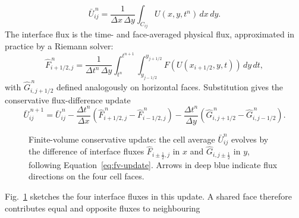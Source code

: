 \begin{equation}\label{eq:ch3-cell-average}
  \bar U_{ij}^{\,n}
  = \frac{1}{\Delta x\,\Delta y}
    \int_{C_{ij}} U(x,y,t^n)\,dx\,dy .
\end{equation}
The interface flux is the time- and face-averaged physical flux, approximated in
practice by a Riemann solver:
\begin{equation}\label{eq:ch3-interface-flux}
  \widehat F_{i+1/2,j}^{\,n}
  =
  \frac{1}{\Delta t^n\,\Delta y}
  \int_{t^n}^{t^{n+1}}\!\!\int_{y_{j-1/2}}^{y_{j+1/2}}
  F(U(x_{i+1/2},y,t))\,dy\,dt ,
\end{equation}
with \(\widehat G_{i,j+1/2}^{\,n}\) defined analogously on horizontal faces.
Substitution gives the conservative flux-difference update
\begin{equation}\label{eq:fv-update}
  \bar U_{ij}^{\,n+1}
  =
  \bar U_{ij}^{\,n}
  - \frac{\Delta t^n}{\Delta x}
    \left(\widehat F_{i+1/2,j}^{\,n}
          -\widehat F_{i-1/2,j}^{\,n}\right)
  - \frac{\Delta t^n}{\Delta y}
    \left(\widehat G_{i,j+1/2}^{\,n}
          -\widehat G_{i,j-1/2}^{\,n}\right).
\end{equation}
\begin{figure}[htbp]
\centering
{}
\caption[Finite-volume conservative update on a 2D cell]{Finite-volume conservative update: the cell average $\bar U_{ij}^n$
evolves by the difference of interface fluxes $\widehat F_{i\pm\tfrac{1}{2},j}$ in
$x$ and $\widehat G_{i,j\pm\tfrac{1}{2}}$ in $y$, following
Equation~\ref{eq:fv-update}. Arrows in deep blue indicate flux directions on the four cell faces.}
\label{fig:ch3-fv-cell}
\end{figure}
Fig.~\ref{fig:ch3-fv-cell} sketches the four interface fluxes in this update.
A shared face therefore contributes equal and opposite fluxes to neighbouring
